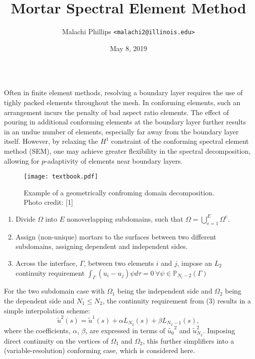 \documentclass[final,t]{beamer}
\title{Mortar Spectral Element Method}
\author{Malachi Phillips \texttt{<malachi2@illinois.edu>}}
\institute{%
  Computer Science
  $\cdot$ University of Illinois
}
\date{May 8, 2019}
\begin{document}
\begin{frame}[fragile]{}
  \begin{columns}[t]


    \begin{column}{.45\linewidth}
      \begin{tcolorbox}[toplevelbox,adjusted title={Problem Statement}]
      Often in finite element methods, resolving a boundary layer requires
      the use of tighly packed elements throughout the mesh. In conforming
      elements, such an arrangement incurs the penalty of bad aspect ratio elements.
      The effect of pouring in additional conforming elements at the boundary layer
      further results in an undue number of elements, especially far away from the
      boundary layer itself. However, by relaxing the $H^1$ constraint of the
      conforming spectral element method (SEM), one may achieve greater flexibility
      in the spectral decomposition, allowing for $p$-adaptivity of elements near
      boundary layers.
      \end{tcolorbox}

      \begin{tcolorbox}[toplevelbox,adjusted title=Approach]
      \begin{figure}
      \texttt{[image: textbook.pdf]}

\caption{Example of a geometrically confroming domain decomposition. Photo credit: [1]}
      \end{figure}
\begin{enumerate}
\def\labelenumi{\arabic{enumi}.}
\item
  Divide \(\Omega\) into \(E\) nonoverlapping subdomains, such that
  \(\Omega=\bigcup_{e=1}^{E} \Omega ^e\).
\item
  Assign (non-unique) mortars to the surfaces between two different subdomains, assigning dependent and independent sides.
\item
  Across the interface, \(\Gamma\), between two elements \(i\) and
  \(j\), impose an \(L_2\) continuity requirement
  \(\int_{\Gamma}(u_i-u_j)\psi d\tau = 0\ \forall \psi \in \mathbb{P}_{N_i-2}(\Gamma)\)
\end{enumerate}

For the two subdomain case with \(\Omega_1\) being the independent side and \(\Omega_2\)
being the dependent side and $N_1 \le N_2$, the continuity requirement from (3) results
in a simple interpolation scheme:
\begin{equation}
\tilde{u}^2(s) = \tilde{u}^1(s) + \alpha L_{N_2}(s) + \beta L_{N_2-1}(s) \nonumber ,
\end{equation}
where the coefficients, $\alpha$, $\beta$, are expressed in terms of $\tilde{u_0}^2$ and
$\tilde{u}_{N_2}^2$. Imposing direct continuity on the vertices of $\Omega_1$ and $\Omega_2$,
this further simplifiers into a (variable-resolution) conforming case, which is considered here.


\end{tcolorbox}
\end{column}
\end{columns}
\end{frame}
\end{document}
